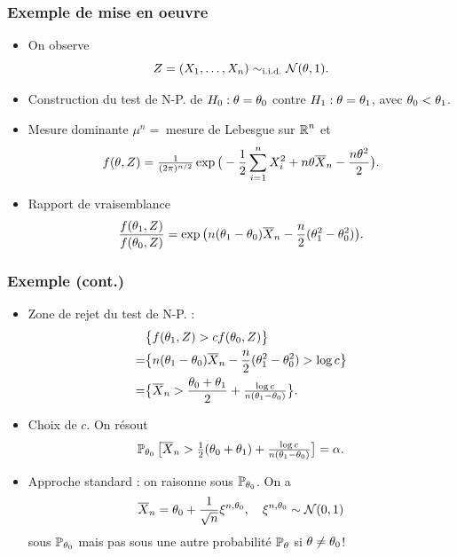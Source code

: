 \begin{frame}
\frametitle{Exemple de mise en oeuvre}
\begin{itemize}
\item On observe
$$Z=(X_1,\ldots, X_n) \sim_{\text{i.i.d.}} {\mathcal N}(\theta, 1).$$
\item \alert{Construction du test de N-P.} de $H_0:\theta = \theta_0$ contre $H_1:\theta = \theta_1$, avec $\theta_0 < \theta_1$.
\item \alert{Mesure dominante} $\mu^n=\;$mesure de Lebesgue sur $\operatorname{{\mathbb R}}^n$ et
$$f(\theta, Z)=\tfrac{1}{(2\pi)^{n/2}}\exp\big(-\frac{1}{2}\sum_{i = 1}^n X_i^2+n\theta\overline{X}_n-\frac{n\theta^2}{2}\big).$$
\item \alert{Rapport de vraisemblance}
$$\frac{f(\theta_1,Z)}{f(\theta_0,Z)} = \exp\big(n(\theta_1-\theta_0)\overline{X}_n-\frac{n}{2}(\theta_1^2-\theta_0^2)\big).$$
\end{itemize}
\end{frame}

\begin{frame}
\frametitle{Exemple (cont.)}
\begin{itemize}
\item \alert{Zone de rejet} du test de N-P. :
\begin{align*}
& \big\{f(\theta_1,Z) >  cf(\theta_0,Z)\big\}\\
  =& \big\{n(\theta_1-\theta_0)\overline{X}_n-\frac{n}{2}(\theta_1^2-\theta_0^2) > \log c\big\} \\
 =& \big\{\overline{X}_n > \frac{\theta_0+\theta_1}{2}+\tfrac{\log c}{n(\theta_1-\theta_0)}\big\}.
\end{align*}
\item \alert{Choix de $c$}. On résout
$$\operatorname{{\mathbb P}}_{\theta_0}\big[\overline{X}_n > \tfrac{1}{2}(\theta_0+\theta_1)+\tfrac{\log c}{n(\theta_1-\theta_0)}\big]=\alpha.$$
\item \alert{Approche standard} : on raisonne sous $\operatorname{{\mathbb P}}_{\theta_0}$. On a
$$\overline{X}_n = \theta_0 + \frac{1}{\sqrt{n}}\xi^{n,\theta_0}, \quad \xi^{n,\theta_0} \sim {\mathcal N}(0,1)$$
sous $\operatorname{{\mathbb P}}_{\theta_0}$ \alert{mais pas sous une autre probabilité $\operatorname{{\mathbb P}}_\theta$ si $\theta \neq \theta_0$!}
\end{itemize}
\end{frame}


